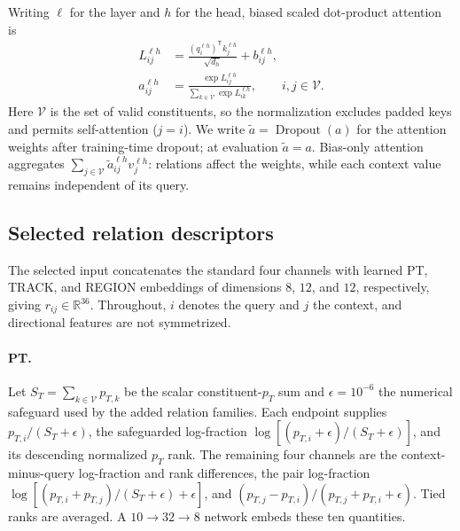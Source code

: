 Writing $\ell$ for the layer and $h$ for the head, biased scaled dot-product attention~\cite{Vaswani2017Attention,Qu2022ParticleTransformer} is
\begin{equation}
 \begin{aligned}
 L^{\ell h}_{ij}
 &=\frac{(q_i^{\ell h})^{\mathsf T}k_j^{\ell h}}{\sqrt{d_h}}
       +b^{\ell h}_{ij},\\
 a^{\ell h}_{ij}
 &=\frac{\exp L^{\ell h}_{ij}}
        {\sum_{k\in\mathcal V}\exp L^{\ell h}_{ik}},
 \qquad i,j\in\mathcal V.
 \end{aligned}
 \label{eq:biased-attention}
\end{equation}
Here $\mathcal V$ is the set of valid constituents, so the normalization excludes
padded keys and permits self-attention ($j=i$). We write
$\widetilde a=\operatorname{Dropout}(a)$ for the attention weights after
training-time dropout; at evaluation $\widetilde a=a$.
Bias-only attention aggregates $\sum_{j\in\mathcal V}\widetilde a^{\ell h}_{ij}v_j^{\ell h}$:
relations affect the weights, while each context value remains independent of its query.

\subsection{Selected relation descriptors}

The selected input concatenates the standard four channels with learned PT, TRACK, and REGION embeddings of dimensions $8$, $12$, and $12$, respectively, giving $r_{ij}\in\mathbb R^{36}$. Throughout, $i$ denotes the query and $j$ the context, and directional features are not symmetrized.

\paragraph{PT.}
Let $S_T=\sum_{k\in\mathcal V}p_{T,k}$ be the scalar constituent-$p_T$ sum
and $\epsilon=10^{-6}$ the numerical safeguard used by the added relation
families. Each endpoint supplies $p_{T,i}/(S_T+\epsilon)$, the safeguarded
log-fraction $\log[(p_{T,i}+\epsilon)/(S_T+\epsilon)]$, and its descending
normalized $p_T$ rank. The remaining four channels are the context-minus-query
log-fraction and rank differences, the pair log-fraction
$\log[(p_{T,i}+p_{T,j})/(S_T+\epsilon)+\epsilon]$, and
$(p_{T,j}-p_{T,i})/(p_{T,j}+p_{T,i}+\epsilon)$. Tied ranks are averaged.
A $10\!\to\!32\!\to\!8$ network embeds these ten quantities.

